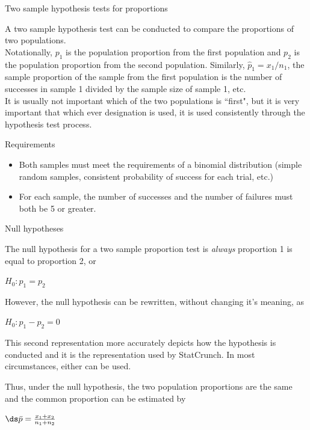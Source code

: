\documentclass[xcolor=table]{beamer}
\begin{document}
\begin{frame}{Two sample hypothesis tests for proportions}
\begin{block}{}
\large
A two sample hypothesis test can be conducted to compare the proportions of two populations.\\
\pause\medskip
Notationally, $p_1$ is the population proportion from the first population and $p_2$ is the population proportion from the second population. Similarly, $\hat p_1 = x_1/n_1$, the sample proportion of the sample from the first population is the number of successes in sample 1 divided by the sample size of sample 1, etc.\\
\pause\medskip
It is usually not important which of the two populations is ``first", but it is very important that which ever designation is used, it is used consistently through the hypothesis test process.
\end{block}
\end{frame}

\begin{frame}{Requirements}
\begin{block}{}
\large
\begin{itemize}
\item Both samples must meet the requirements of a binomial distribution (simple random samples, consistent probability of success for each trial, etc.)
\pause\item For each sample, the number of successes and the number of failures must both be 5 or greater.
\end{itemize}
\end{block}
\end{frame}


\begin{frame}{Null hypotheses}
\begin{block}{}
\large
The null hypothesis for a two sample proportion test is \emph{always} proportion 1 is equal to proportion 2, or\\
\smallskip
{\centering $H_0: p_1 = p_2$ \par}
\pause\medskip
However, the null hypothesis can be rewritten, without changing it's meaning, as\\
\smallskip
{\centering $H_0: p_1 - p_2 = 0$ \par}
\pause\medskip
This second representation more accurately depicts how the hypothesis is conducted and it is the representation used by StatCrunch. In most circumstances, either can be used.
\end{block}
\pause
\begin{block}{}
\large
Thus, under the null hypothesis, the two population proportions are the same and the common proportion can be estimated by\\
\medskip
{\centering
$\ds \bar p = \frac{x_1 + x_2}{n_1 + n_2}$
\par}
\end{block}
\end{frame}
\end{document}
